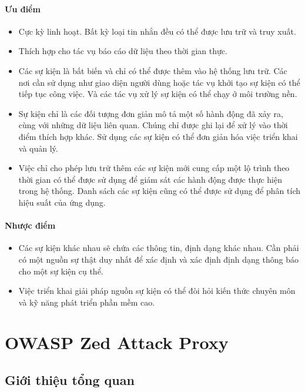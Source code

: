 \paragraph{Ưu điểm}

\begin{itemize}
    \item Cực kỳ linh hoạt. Bất kỳ loại tin nhắn đều có thể được lưu trữ và truy xuất.
    \item Thích hợp cho tác vụ báo cáo dữ liệu theo thời gian thực.
    \item Các sự kiện là bất biến và chỉ có thể được thêm vào hệ thống lưu trữ. Các nơi cần sử dụng như giao diện người dùng hoặc tác vụ khởi tạo sự kiện có thể tiếp tục công việc. Và các tác vụ xử lý sự kiện có thể chạy ở môi trường nền.
    \item Sự kiện chỉ là các đối tượng đơn giản mô tả một số hành động đã xảy ra, cùng với những dữ liệu liên quan. Chúng chỉ được ghi lại để xử lý vào thời điểm thích hợp khác. Sử dụng các sự kiện có thể đơn giản hóa việc triển khai và quản lý.
    \item Việc chỉ cho phép lưu trữ thêm các sự kiện mới cung cấp một lộ trình theo thời gian có thể được sử dụng để giám sát các hành động được thực hiện trong hệ thống. Danh sách các sự kiện cũng có thể được sử dụng để phân tích hiệu suất của ứng dụng.
\end{itemize}

\paragraph{Nhược điểm}

\begin{itemize}
    \item Các sự kiện khác nhau sẽ chứa các thông tin, định dạng khác nhau. Cần phải có một nguồn sự thật duy nhất để xác định và xác định định dạng thông báo cho một sự kiện cụ thể.
    \item Việc triển khai giải pháp nguồn sự kiện có thể đòi hỏi kiến thức chuyên môn và kỹ năng phát triển phần mềm cao.
\end{itemize}

\section{OWASP Zed Attack Proxy} \label{sec:ZAP}

\subsection{Giới thiệu tổng quan}

